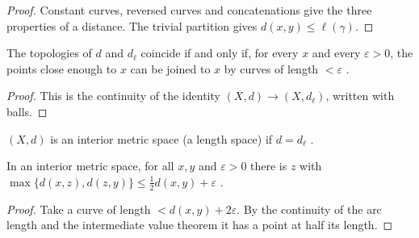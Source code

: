 \begin{proof}
  \leanok
  Constant curves, reversed curves and concatenations give the three properties of a distance.
  The trivial partition gives $d(x, y) \leq \ell(\gamma)$.
\end{proof}

\begin{lemma}
  \label{lem:ms-topologies}
  \leanok
  The topologies of $d$ and $d_\ell$ coincide if and only if, for every $x$ and every
  $\varepsilon > 0$, the points close enough to $x$ can be joined to $x$ by curves of length
  $< \varepsilon$ \cite[Lema~8.1.8]{Lar22}.
\end{lemma}

\begin{proof}
  \leanok
  This is the continuity of the identity $(X, d) \to (X, d_\ell)$, written with balls.
\end{proof}

\begin{definition}
  \label{def:ms-interior}
  \leanok
  $(X, d)$ is an interior metric space (a length space) if $d = d_\ell$
  \cite[\S8.1.1]{Lar22}.
\end{definition}

\begin{proposition}
  \label{prop:ms-midpoints}
  \leanok
  In an interior metric space, for all $x, y$ and $\varepsilon > 0$ there is $z$ with
  $\max\{d(x, z), d(z, y)\} \leq \frac12 d(x, y) + \varepsilon$ \cite[Problema~8.III]{Lar22}.
\end{proposition}

\begin{proof}
  \leanok
  Take a curve of length $< d(x, y) + 2\varepsilon$. By the continuity of the arc length and the
  intermediate value theorem it has a point at half its length.
\end{proof}

